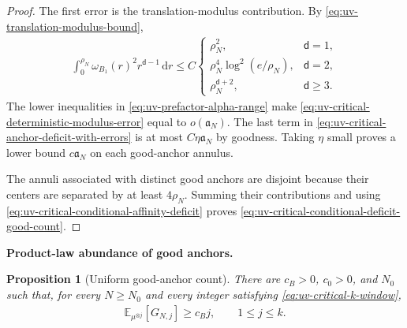 \documentclass[11pt,reqno]{amsart}
\numberwithin{equation}{section}
\theoremstyle{plain}
\newtheorem{prop}[prop]{Proposition}
\theoremstyle{remark}
\renewcommand{\d}{\mathsf{d}}
\newcommand{\md}{\mathrm{d}}
\newcommand{\E}{{\mathbb{E}}}
\newcommand{\parheading}[1]{\par\medskip\noindent\textbf{#1}\ }
\begin{document}
\begin{proof}
The first error is the translation-modulus contribution.  By \eqref{eq:uv-translation-modulus-bound},
\begin{align}\label{eq:uv-critical-deterministic-modulus-error}
 \int_0^{\rho_N}\omega_{B_1}(r)^2r^{\d-1}\,\md r
 \le C
 \begin{cases}
 \rho_N^2,&\d=1,\\
 \rho_N^4\log^2(e/\rho_N),&\d=2,\\
 \rho_N^{\d+2},&\d\ge3.
 \end{cases}
\end{align}
The lower inequalities in \eqref{eq:uv-prefactor-alpha-range} make \eqref{eq:uv-critical-deterministic-modulus-error} equal to \(o(\mathfrak a_N)\).  The last term in \eqref{eq:uv-critical-anchor-deficit-with-errors} is at most \(C\eta\mathfrak a_N\) by goodness.  Taking \(\eta\) small proves a lower bound \(c\mathfrak a_N\) on each good-anchor annulus.

The annuli associated with distinct good anchors are disjoint because their centers are separated by at least \(4\rho_N\).  Summing their contributions and using \eqref{eq:uv-critical-conditional-affinity-deficit} proves \eqref{eq:uv-critical-conditional-deficit-good-count}.
\end{proof}

\parheading{Product-law abundance of good anchors.}

\begin{prop}[Uniform good-anchor count]
\label{prop:uv-critical-good-anchor-count}
There are \(c_B>0\), \(c_0>0\), and \(N_0\) such that, for every \(N\ge N_0\) and every integer satisfying \eqref{eq:uv-critical-k-window},
\begin{align}\label{eq:uv-critical-expected-good-count}
 \E_{\mu^{\otimes j}}\left[G_{N,j}\right]\ge c_Bj,
 \qquad 1\le j\le k.
\end{align}
\end{prop}
\end{document}
